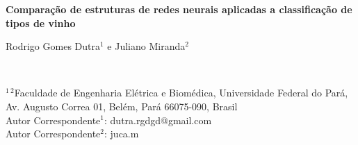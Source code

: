 



\begin{center}


\vspace*{2 cm}

\textsf{\bfseries 
\huge Comparação de estruturas de redes neurais aplicadas a classificação de tipos de vinho}



\vspace*{1.5 cm}

	\begin{large}
Rodrigo Gomes Dutra$^{1}$ e
Juliano Miranda$^{2}$
	\end{large} \\[1.7 mm]



	\begin{small}
$^{1\ 2}$Faculdade de Engenharia Elétrica e Biomédica, Universidade Federal do Pará, \\[1 mm]
Av. Augusto Correa 01, Belém, Pará 66075-090, Brasil \\[7 mm]



Autor Correspondente$^{1}$: dutra.rgdgd@gmail.com	\\[1 mm]
Autor Correspondente$^{2}$: juca.m

	\end{small}

\end{center}
 

